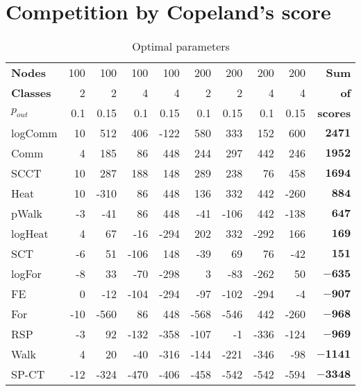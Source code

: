 \documentclass{article}
\begin{document}
\section{Competition by Copeland's score}
\begin{table}[H]{\small
	\centering
	\begin{tabular}{lrrrrrrrrr}
		\toprule
\textbf{Nodes}   & 100&  100& 100&  100& 200&  200& 200&  200&{\textbf{Sum}} \\
\textbf{Classes} &   2&    2&   4&    4&   2&    2&   4&    4&{\textbf{  of}} \\
$p_{out}$        & 0.1&	0.15& 0.1& 0.15& 0.1& 0.15& 0.1& 0.15&{\textbf{scores}} \\
		\midrule
logComm  & 10 & 512 & 406 & -122 & 580 & 333 & 152 & 600 & $\bm{2471}$\\
Comm & 4 & 185 & 86 & 448 & 244 & 297 & 442 & 246 & $\bm{1952}$\\
SCCT & 10 & 287 & 188 & 148 & 289 & 238 & 76 & 458 & $\bm{1694}$\\
Heat & 10 & -310 & 86 & 448 & 136 & 332 & 442 & -260 & $\bm{884}$\\
pWalk & -3 & -41 & 86 & 448 & -41 & -106 & 442 & -138 & $\bm{647}$\\
logHeat & 4 & 67 & -16 & -294 & 202 & 332 & -292 & 166 & $\bm{169}$\\
SCT & -6 & 51 & -106 & 148 & -39 & 69 & 76 & -42 & $\bm{151}$\\
logFor & -8 & 33 & -70 & -298 & 3 & -83 & -262 & 50 & $\bm{-635}$\\
FE & 0 & -12 & -104 & -294 & -97 & -102 & -294 & -4 & $\bm{-907}$\\
For & -10 & -560 & 86 & 448 & -568 & -546 & 442 & -260 & $\bm{-968}$\\
RSP & -3 & 92 & -132 & -358 & -107 & -1 & -336 & -124 & $\bm{-969}$\\
Walk & 4 & 20 & -40 & -316 & -144 & -221 & -346 & -98 & $\bm{-1141}$\\
SP-CT & -12 & -324 & -470 & -406 & -458 & -542 & -542 & -594 & $\bm{-3348}$\\
		\bottomrule
	\end{tabular}
	\caption{\label{t_CopComp} Optimal parameters}
}\end{table}
\end{document}
